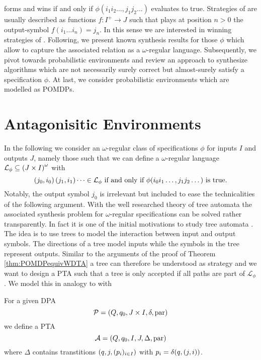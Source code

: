 forms and \outputp{} wins if and only if 
$\phi(i_{1}i_{2}\dots,j_{1}j_{2}\dots)$ evaluates to true. Strategies of 
\outputp{} are usually described as functions $f:I^{+}\rightarrow J$ such that
\outputp{} plays at position $n>0$ the output-symbol 
$f(i_{1}\dots i_{n}) = j_{n}$. In this sense we are interested in winning 
strategies of \outputp{}. Following, we present known synthesis results 
for those $\phi$ which allow to capture the associated relation as a 
$\omega$-regular language. Subsequently, we pivot towards probabilistic 
environments and review an approach to synthesize algorithms which are not
necessarily surely correct but almost-surely satisfy a specification $\phi$. At
last, we consider probabilistic environments which are modelled as \acp{POMDP}.

\section{Antagonisitic Environments}
In the following we consider an $\omega$-regular class of specifications 
$\phi$ for inputs $I$ and outputs $J$, namely those such that we can define a 
$\omega$-regular language $\mathcal{L}_{\phi}\subseteq 
\left(J\times I\right)^{\omega}$ with
\begin{equation}
  \left(j_{0}, i_{0}\right)\left(j_{1}, i_{1}\right)\dots\in\mathcal{L}_{\phi}
  \text{ if and only if }
  \phi(i_{0}i_{1}\dots, j_{1}j_{2}\dots)\text{ is true.}
  \label{eq:omegaregularphi}
\end{equation}
Notably, the output symbol $j_{0}$ is irrelevant but included to ease the
technicalities of the following argument. With the well researched theory of
tree automata the associated synthesis problem for $\omega$-regular
specifications can be solved rather transparently. In fact it is one of the
initial motivations to study tree automata \cite{AutoInfObj}. The idea is to
use trees to model the interaction between input and output symbols. The
directions of a tree model inputs while the symbols in the tree represent 
outputs. Similar to the arguments of the proof of Theorem 
\ref{thm:POMDPequivWDTA} a tree can therefore be understood as strategy and we 
want to design a \ac{PTA} such that a tree is only accepted if all paths are 
part of $\mathcal{L}_{\phi}$. We model this in analogy to
\cite[Lemma 15]{AutoInfObj} with
\begin{definition}
  For a given \ac{DPA}
  \begin{equation*}
    \mathcal{P} = \left(Q, q_{0}, J\times I, \delta, \operatorname{par}\right)
  \end{equation*}
  we define a \ac{PTA}
  \begin{equation*}
    \mathcal{A} = \left(Q, q_{0}, I, J, \Delta, \operatorname{par}\right)
  \end{equation*}
  where $\Delta$ contains transtitions $\left(q, j, (p_{i})_{i\in I}\right)$ with
  $p_{i} = \delta(q, \left(j, i\right))$.
\end{definition}
